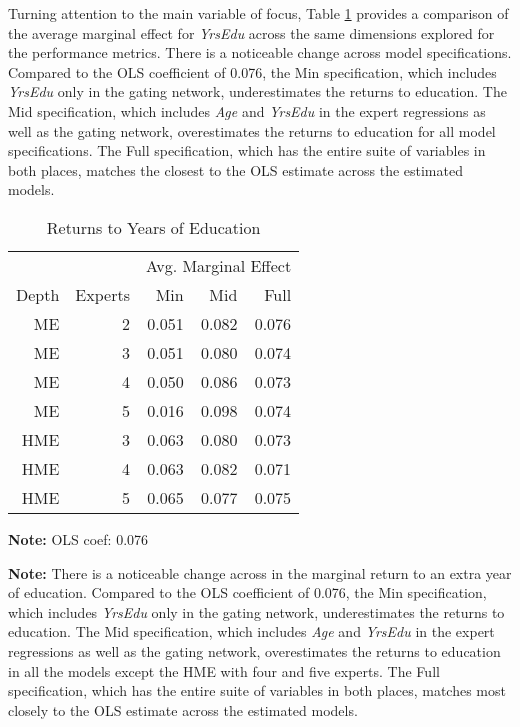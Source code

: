 \documentclass[12pt]{article}
\theoremstyle{definition}
\begin{document}
Turning attention to the main variable of focus, Table \ref{tbl:YrsEdu_coef} provides a 
comparison of the average marginal effect for \textit{YrsEdu} across the same dimensions
explored for the performance metrics. There is a noticeable change across model specifications.
Compared to the OLS coefficient of 0.076, the Min specification,
which includes \textit{YrsEdu} only in the gating network, underestimates the returns
to education. The Mid specification, which includes \textit{Age} and
\textit{YrsEdu} in the expert regressions as well as the gating network,
overestimates the returns to education for all model specifications. The Full specification,
which has the entire suite of variables in both places, matches the closest
to the OLS estimate across the estimated models.



\begin{table}[t!] \centering
  \caption{Returns to Years of Education}
  \begin{threeparttable}
    \begin{tabular}[l]{r r r r r}
  \cmidrule{1-5}
        &         & \multicolumn{3}{c}{Avg. Marginal Effect} \\ 
  \cmidrule(r){3-5}
  Depth & Experts & Min   & Mid   & Full      \\
  \cmidrule{1-5}

  ME      & 2     & 0.051 & 0.082 & 0.076     \\
  ME      & 3     & 0.051 & 0.080 & 0.074     \\ 
  ME      & 4     & 0.050 & 0.086 & 0.073     \\
  ME      & 5     & 0.016 & 0.098 & 0.074     \\
  HME     & 3     & 0.063 & 0.080 & 0.073     \\
  HME     & 4     & 0.063 & 0.082 & 0.071     \\
  HME     & 5     & 0.065 & 0.077 & 0.075     \\

  \hline
    \end{tabular}
    \begin{tablenotes}
      \item{\footnotesize \textbf{Note:} OLS coef: 0.076}
      \item{\footnotesize \textbf{Note:} There is a noticeable change across in the marginal return to an extra year of education.
      Compared to the OLS coefficient of 0.076, the Min specification, which includes \textit{YrsEdu} only in the gating network, underestimates the returns to education.
      The Mid specification, which includes \textit{Age} and \textit{YrsEdu} in the expert regressions as well as the gating network, overestimates the returns to education in all the models except the HME with four and five experts.
      The Full specification, which has the entire suite of variables in both places, matches most closely to the OLS estimate across the estimated models.}
    \end{tablenotes} \label{tbl:YrsEdu_coef}
  \end{threeparttable}
\end{table}
\end{document}
